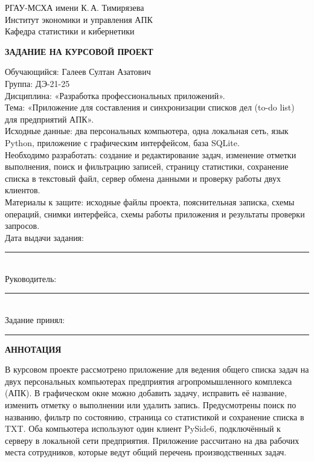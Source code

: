 \documentclass[14pt,a4paper]{extreport}
\begin{document}

\thispagestyle{plain}
\begin{center}
{\small РГАУ-МСХА имени К.\,А. Тимирязева\\
Институт экономики и управления АПК\\
Кафедра статистики и кибернетики}\par\vspace{10mm}
\textbf{ЗАДАНИЕ НА КУРСОВОЙ ПРОЕКТ}
\end{center}
\vspace{5mm}
\noindent Обучающийся: Галеев Султан Азатович\\[4mm]
\noindent Группа: ДЭ-21-25\\[4mm]
\noindent Дисциплина: «Разработка профессиональных приложений».\\[4mm]
\noindent Тема: «Приложение для составления и синхронизации списков дел (to-do list) для предприятий АПК».\\[4mm]
\noindent Исходные данные: два персональных компьютера, одна локальная сеть, язык Python, приложение с графическим интерфейсом, база SQLite.\\[4mm]
\noindent Необходимо разработать: создание и редактирование задач, изменение отметки выполнения, поиск и фильтрацию записей, страницу статистики, сохранение списка в текстовый файл, сервер обмена данными и проверку работы двух клиентов.\\[4mm]
\noindent Материалы к защите: исходные файлы проекта, пояснительная записка, схемы операций, снимки интерфейса, схемы работы приложения и результаты проверки запросов.\\[12mm]
\noindent Дата выдачи задания: \rule{58mm}{0.4pt}\\[8mm]
\noindent Руководитель: \rule{87mm}{0.4pt}\\[8mm]
\noindent Задание принял: \rule{84mm}{0.4pt}
\vfill

\clearpage

\thispagestyle{plain}
\begin{center}\textbf{АННОТАЦИЯ}\end{center}

В курсовом проекте рассмотрено приложение для ведения общего списка задач на двух персональных компьютерах предприятия агропромышленного комплекса (АПК). В графическом окне можно добавить задачу, исправить её название, изменить отметку о выполнении или удалить запись. Предусмотрены поиск по названию, фильтр по состоянию, страница со статистикой и сохранение списка в TXT. Оба компьютера используют один клиент PySide6, подключённый к серверу в локальной сети предприятия. Приложение рассчитано на два рабочих места сотрудников, которые ведут общий перечень производственных задач.
\end{document}
